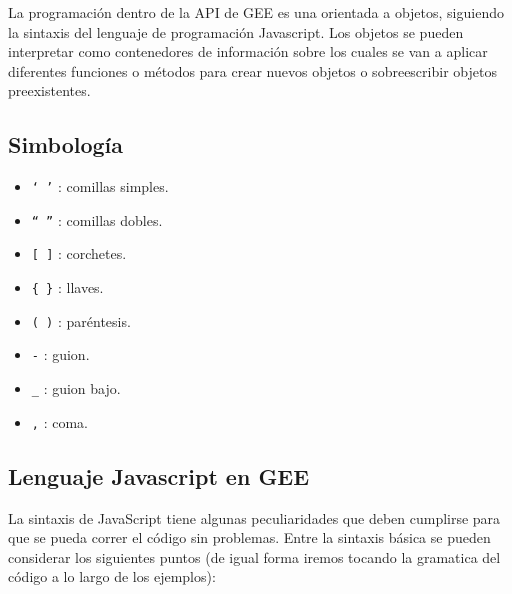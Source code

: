 \documentclass[
  12pt,
  letterpaper,
  twoside]{book}
\providecommand{\tightlist}{%
  \setlength{\itemsep}{0pt}\setlength{\parskip}{0pt}}
\begin{document}
La programación dentro de la API de GEE es una orientada a objetos, siguiendo la sintaxis del lenguaje de programación Javascript. Los objetos se pueden interpretar como contenedores de información sobre los cuales se van a aplicar diferentes funciones o métodos para crear nuevos objetos o sobreescribir objetos preexistentes.

\hypertarget{simbologuxeda}{%
\subsection{Simbología}\label{simbologuxeda}}

\begin{itemize}
\tightlist
\item
  \texttt{‘\ ’} : comillas simples.
\item
  \texttt{“\ ”} : comillas dobles.
\item
  \texttt{{[}\ {]}} : corchetes.
\item
  \texttt{\{\ \}} : llaves.
\item
  \texttt{(\ )} : paréntesis.
\item
  \texttt{-} : guion.
\item
  \texttt{\_} : guion bajo.
\item
  \texttt{,} : coma.
\end{itemize}

\hypertarget{lenguaje-javascript-en-gee}{%
\subsection{Lenguaje Javascript en GEE}\label{lenguaje-javascript-en-gee}}

La sintaxis de JavaScript tiene algunas peculiaridades que deben cumplirse para que se pueda correr el código sin problemas. Entre la sintaxis básica se pueden considerar los siguientes puntos (de igual forma iremos tocando la gramatica del código a lo largo de los ejemplos):
\end{document}
